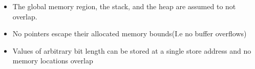 \documentclass{kththesis}
\begin{document}
\begin{itemize}
    \item The global memory region, the stack, and the heap are assumed to not overlap.
    \item No pointers escape their allocated memory bounds(I.e no buffer overflows)
    \item Values of arbitrary bit length can be stored at a single store address and no memory locations overlap
\end{itemize}
\end{document}
